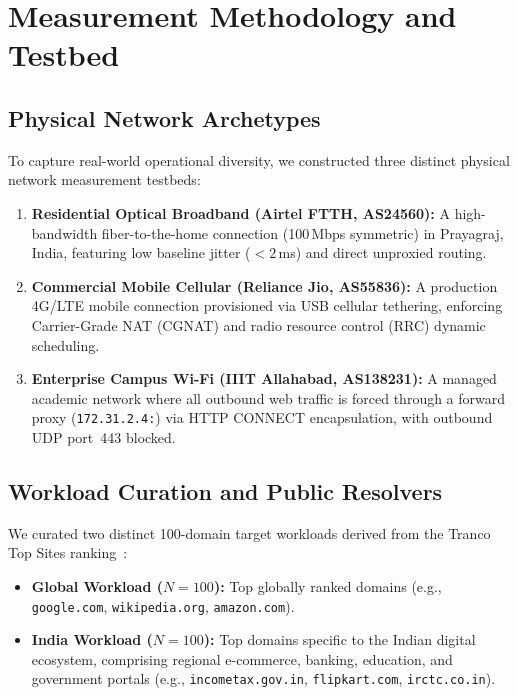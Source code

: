 \documentclass[conference,10pt]{IEEEtran}
\begin{document}
\section{Measurement Methodology and Testbed}
\label{sec:methods}

\subsection{Physical Network Archetypes}
To capture real-world operational diversity, we constructed three distinct physical network measurement testbeds:
\begin{enumerate}
    \item \textbf{Residential Optical Broadband (Airtel FTTH, AS24560):} A high-bandwidth fiber-to-the-home connection (100\,Mbps symmetric) in Prayagraj, India, featuring low baseline jitter ($< 2$\,ms) and direct unproxied routing.
    \item \textbf{Commercial Mobile Cellular (Reliance Jio, AS55836):} A production 4G/LTE mobile connection provisioned via USB cellular tethering, enforcing Carrier-Grade NAT (CGNAT) and radio resource control (RRC) dynamic scheduling.
    \item \textbf{Enterprise Campus Wi-Fi (IIIT Allahabad, AS138231):} A managed academic network where all outbound web traffic is forced through a forward proxy (\texttt{172.31.2.4:}) via HTTP CONNECT encapsulation, with outbound UDP port~443 blocked.
\end{enumerate}

\subsection{Workload Curation and Public Resolvers}
We curated two distinct 100-domain target workloads derived from the Tranco Top Sites ranking~\cite{lepochat2019tranco}:
\begin{itemize}
    \item \textbf{Global Workload ($N=100$):} Top globally ranked domains (e.g., \texttt{google.com}, \texttt{wikipedia.org}, \texttt{amazon.com}).
    \item \textbf{India Workload ($N=100$):} Top domains specific to the Indian digital ecosystem, comprising regional e-commerce, banking, education, and government portals (e.g., \texttt{incometax.gov.in}, \texttt{flipkart.com}, \texttt{irctc.co.in}).
\end{itemize}
\end{document}
